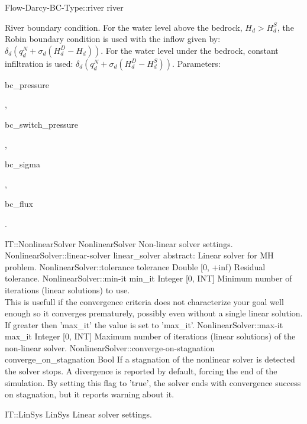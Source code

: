 \begin{SelectionType}
{{}}
		\SelectionItem
			{Flow-Darcy-BC-Type::river}
			{river}
			{{{River boundary condition.
For the water level above the bedrock, }{$H_d > H_d^S$}{, the Robin boundary condition is used with the inflow given by: }{ $ \delta_d(q_d^N + \sigma_d(H_d^D - H_d) )$}{. For the water level under the bedrock, constant infiltration is used: }{ $ \delta_d(q_d^N + \sigma_d(H_d^D - H_d^S) )$}{. Parameters: }\begin{ttfamily}bc{\_}pressure\end{ttfamily}{, }\begin{ttfamily}bc{\_}switch{\_}pressure\end{ttfamily}{,  }\begin{ttfamily}bc{\_}sigma\end{ttfamily}{, }\begin{ttfamily}bc{\_}flux\end{ttfamily}{.}%
}}
\end{SelectionType}
\begin{RecordType}
	{IT::NonlinearSolver}
	{NonlinearSolver}
	{}%
	{}%
	{{{Non-linear solver settings.}%
}}
		\RecKey
			{NonlinearSolver::linear-solver}
			{linear{\_}solver}
			{{abstract: }}{}
			{ \ValueDefault{{\{}{\}}}}
			{{{Linear solver for MH problem.}%
}}
		\RecKey
			{NonlinearSolver::tolerance}
			{tolerance}
			{{Double [0, +inf)}}{}
			{ }
			{{{Residual tolerance.}%
}}
		\RecKey
			{NonlinearSolver::min-it}
			{min{\_}it}
			{{Integer [0, INT]}}{}
			{ }
			{{{Minimum number of iterations (linear solutions) to use.}\\{
This is usefull if the convergence criteria does not characterize your goal well enough so it converges prematurely, possibly even without a single linear solution.
If greater then 'max{\_}it' the value is set to 'max{\_}it'.}%
}}
		\RecKey
			{NonlinearSolver::max-it}
			{max{\_}it}
			{{Integer [0, INT]}}{}
			{ }
			{{{Maximum number of iterations (linear solutions) of the non-linear solver.}%
}}
		\RecKey
			{NonlinearSolver::converge-on-stagnation}
			{converge{\_}on{\_}stagnation}
			{{Bool}}{}
			{ }
			{{{If a stagnation of the nonlinear solver is detected the solver stops.
A divergence is reported by default, forcing the end of the simulation.
By setting this flag to 'true', the solver ends with convergence success on stagnation, but it reports warning about it.}%
}}
\end{RecordType}
\begin{AbstractType}
	{IT::LinSys}
	{LinSys}
	{}
	{{{Linear solver settings.}%
}}
\end{AbstractType}
